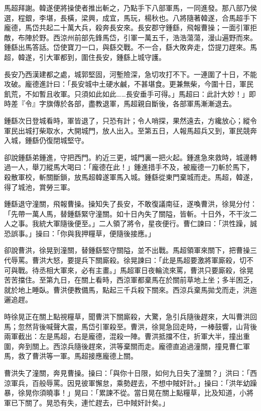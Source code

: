 馬超拜謝。韓遂便將操使者推出斬之，乃點手下八部軍馬，一同進發。那八部乃侯選，程銀，李堪，長橫，梁興，成宜，馬玩，楊秋也。八將隨著韓遂，合馬超手下龐德，馬岱共起二十萬大兵，殺奔長安來。長安郡守鍾繇，飛報曹操；一面引軍拒敵，布陣於野。西涼州前部先鋒馬岱，引軍一萬五千，浩浩蕩蕩，漫山遍野而來。鍾繇出馬答話。岱使寶刀一口，與繇交戰。不一合，繇大敗奔走，岱提刀趕來。馬超，韓遂，引大軍都到，圍住長安，鍾繇上城守護。

長安乃西漢建都之處，城郭堅固，河塹險深，急切攻打不下。一連圍了十日，不能攻破。龐德進計曰：「長安城中土硬水鹹，不甚堪食。更兼無柴，今圍十日，軍民飢荒，不如暫且收軍。只須如此如此……長安垂手可得。」馬超曰：此計大妙！」即時差『令』字旗傳於各部，盡教退軍，馬超親自斷後，各部軍馬漸漸退去。

鍾繇次日登城看時，軍皆退了，只恐有計；令人哨探，果然遠去，方纔放心；縱令軍民出城打柴取水，大開城門，放人出入。至第五日，人報馬超兵又到，軍民競奔入城，鍾繇仍復閉城堅守。

卻說鍾繇弟鍾進，守把西門。約近三更，城門裏一把火起。鍾進急來救時，城邊轉過一人，舉刀縱馬大喝曰：「龐德在此！」鍾進措手不及，被龐德一刀斬於馬下，殺散軍校，斬關斷鎖，放馬超韓遂軍馬入城。鍾繇從東門棄城而走。馬超，韓遂，得了城池，賞勞三軍。

鍾繇退守潼關，飛報曹操。操知失了長安，不敢復議南征，遂喚曹洪，徐晃分付：「先帶一萬人馬，替鍾繇緊守潼關。如十日內失了關隘，皆斬。十日外，不干汝二人之事。我統大軍隨後便至。」二人領了將令，星夜便行。曹仁諫曰：「洪性躁，誠恐誤事。」操曰：「你與我押糧草，便隨後接應。」

卻說曹洪，徐晃到潼關，替鍾繇堅守關隘，並不出戰。馬超領軍來關下，把曹操三代辱罵。曹洪大怒，要提兵下關廝殺。徐晃諫曰：「此是馬超要激將軍廝殺，切不可與戰。待丞相大軍來，必有主畫。」馬超軍日夜輪流來罵，曹洪只要廝殺，徐晃苦苦擋住。至第九日，在關上看時，西涼軍都棄馬在於關前草地上坐；多半困乏，就於地上睡臥。曹洪便教備馬，點起三千兵殺下關來。西涼兵棄馬拋戈而走，洪迤邐追趕。

時徐晃正在關上點視糧草，聞曹洪下關廝殺，大驚，急引兵隨後趕來，大叫曹洪回馬；忽然背後喊聲大震，馬岱引軍殺至。曹洪，徐晃急回走時，一棒鼓響，山背後兩軍截出：左是馬超，右是龐德，混殺一陣。曹洪抵擋不住，折軍大半，撞出重圍，奔到關上。西涼兵隨後趕來，洪等棄關而走。龐德直追過潼關，撞見曹仁軍馬，救了曹洪等一軍。馬超接應龐德上關。

曹洪失了潼關，奔見曹操。操曰：「與你十日限，如何九日失了潼關？」洪曰：「西涼軍兵，百般辱罵。因見彼軍懈怠，乘勢趕去，不想中賊奸計。」操曰：「洪年幼躁暴，徐晃你須曉事！」晃曰：「累諫不從。當日晃在關上點糧草，比及知道，小將軍已下關了。晃恐有失，連忙趕去，已中賊奸計矣。」

